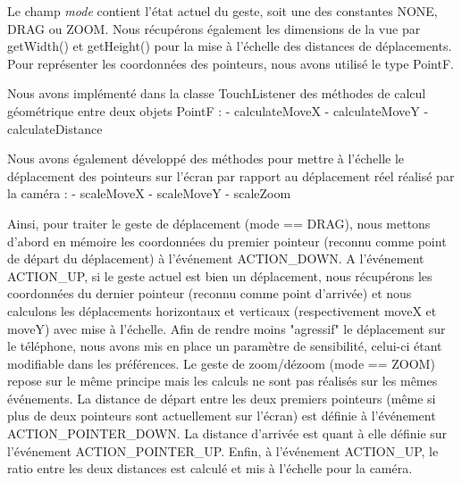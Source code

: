 Le champ \textit{mode} contient l'état actuel du geste, soit une des constantes NONE, DRAG ou ZOOM.
Nous récupérons également les dimensions de la vue par getWidth() et getHeight() pour la mise à l'échelle des distances de déplacements. 
Pour représenter les coordonnées des pointeurs, nous avons utilisé le type PointF.

Nous avons implémenté dans la classe TouchListener des méthodes de calcul géométrique entre deux objets PointF :
- calculateMoveX
- calculateMoveY
- calculateDistance

Nous avons également développé des méthodes pour mettre à l'échelle le déplacement des pointeurs sur l'écran par rapport au déplacement réel réalisé par la caméra :
- scaleMoveX
- scaleMoveY
- scaleZoom

Ainsi, pour traiter le geste de déplacement (mode == DRAG), nous mettons d'abord en mémoire les coordonnées du premier pointeur (reconnu comme point de départ du déplacement) à l'événement ACTION_DOWN.
A l'événement ACTION_UP, si le geste actuel est bien un déplacement, nous récupérons les coordonnées du dernier pointeur (reconnu comme point d'arrivée) et nous calculons les déplacements horizontaux
et verticaux (respectivement moveX et moveY) avec mise à l'échelle. Afin de rendre moins "agressif" le déplacement sur le téléphone, nous avons mis en place un paramètre de sensibilité, celui-ci étant
modifiable dans les préférences.
Le geste de zoom/dézoom (mode == ZOOM) repose sur le même principe mais les calculs ne sont pas réalisés sur les mêmes événements. La distance de départ entre les deux premiers pointeurs (même
si plus de deux pointeurs sont actuellement sur l'écran) est définie à l'événement ACTION_POINTER_DOWN. La distance d'arrivée est quant à elle définie sur l'événement ACTION_POINTER_UP.
Enfin, à l'événement ACTION_UP, le ratio entre les deux distances est calculé et mis à l'échelle pour la caméra.